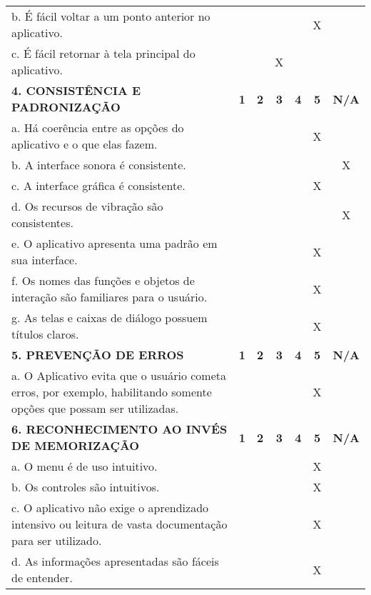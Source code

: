 \documentclass[portuguese,oneside]{tcc}
\begin{document}
\begin{center}
\begin{longtabu}{|L{25em}|c|c|c|c|c|c|}
																						b. É fácil voltar a um ponto anterior no aplicativo. & & & & & X & \\ 
																						c. É fácil retornar à tela principal do aplicativo. & & & X & & & \\ 
																						\textbf{4. CONSISTÊNCIA E PADRONIZAÇÃO} & \textbf{1} & \textbf{2} & \textbf{3} & \textbf{4} & \textbf{5} & \textbf{N/A} \\ 
																						a. Há coerência entre as opções do aplicativo e o que elas fazem. & & & & & X & \\ 
																						b. A interface sonora é consistente. & & & & & & X \\ 
																						c. A interface gráfica é consistente. & & & & & X & \\ 
																						d. Os recursos de vibração são consistentes. & & & & & & X \\ 
																						e. O aplicativo apresenta uma padrão em sua interface. & & & & & X & \\ 
																						f. Os nomes das funções e objetos de interação são familiares para o usuário. & & & & & X & \\ 
																						g. As telas e caixas de diálogo possuem títulos claros. & & & & & X & \\ 
																						\textbf{5. PREVENÇÃO DE ERROS} & \textbf{1} & \textbf{2} & \textbf{3} & \textbf{4} & \textbf{5} & \textbf{N/A} \\ 
																						a. O Aplicativo evita que o usuário cometa erros, por exemplo, habilitando somente opções que possam ser utilizadas. & & & & & X & \\ 
																						\textbf{6. RECONHECIMENTO AO INVÉS DE MEMORIZAÇÃO} & \textbf{1} & \textbf{2} & \textbf{3} & \textbf{4} & \textbf{5} & \textbf{N/A} \\ 
																						a. O  menu é de uso intuitivo. & & & & & X & \\ 
																						b. Os controles são intuitivos. & & & & & X & \\ 
																						c. O aplicativo não exige o aprendizado intensivo ou leitura de vasta documentação para ser utilizado. & & & & & X & \\ 
																						d. As informações apresentadas são fáceis de entender. & & & & & X & \\ 

\end{longtabu}
\end{center}
\end{document}
